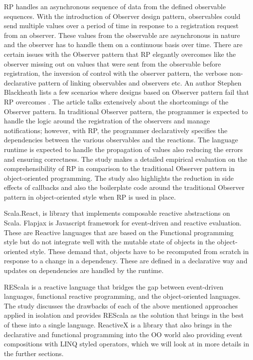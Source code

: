 RP handles an asynchronous sequence of data from the defined observable sequences. 
With the introduction of Observer design pattern, observables could send multiple values over a period of time in response to a registration request from an observer. 
These values from the observable are asynchronous in nature and the observer has to handle them on a continuous basis over time. 
There are certain issues with the Observer pattern that RP elegantly overcomes like the observer missing out on values that were sent from the observable before registration, the inversion of control with the observer pattern, the verbose non-declarative pattern of linking observables and observers etc. 
An author Stephen Blackheath lists a few scenarios where designs based on Observer pattern fail that RP overcomes \cite{whyFRP}. 
The article\cite{deprecatingTheObserverPattern} talks extensively about the shortcomings of the Observer pattern. 
In traditional Observer pattern, the programmer is expected to handle the logic around the registration of the observers and manage notifications; however, with RP, the programmer declaratively specifies the dependencies between the various observables and the reactions. 
The language runtime is expected to handle the propagation of values also reducing the errors and ensuring correctness. 
The study\cite{Salvaneschi:2014:ESP:2635868.2635895} makes a detailed empirical evaluation on the comprehensibility of RP in comparison to the traditional Observer pattern in object-oriented programming. 
The study also highlights the reduction in side effects of callbacks and also the boilerplate code around the traditional Observer pattern in object-oriented style when RP is used in place.

Scala.React\cite{deprecatingTheObserverPattern}, is library that implements composable reactive abstractions on Scala. Flapjax\cite{Meyerovich:2009:FPL:1639949.1640091} is Javascript framework for event-driven and reactive evaluation. These are Reactive languages that are based on the Functional programming style but do not integrate well with the mutable state of objects in the object-oriented style. These demand that, objects have to be recomputed from scratch in response to a change in a dependency. These are defined in a declarative way and updates on dependencies are handled by the runtime.

REScala\cite{Salvaneschi:2014:RBO:2577080.2577083} is a reactive language that bridges the gap between event-driven languages, functional reactive programming, and the object-oriented languages. The study\cite{Salvaneschi:2014:RBO:2577080.2577083} discusses the drawbacks of each of the above mentioned approaches applied in isolation and provides REScala as the solution that brings in the best of these into a single language. ReactiveX\cite{reactiveX} is a library that also brings in the declarative and functional programming into the OO world also providing event compositions with LINQ\cite{linq} styled operators, which we will look at in more details in the further sections.

